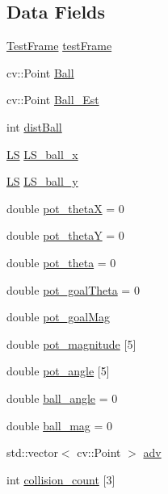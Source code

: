 \subsection*{Data Fields}
\begin{DoxyCompactItemize}
\item 
\hyperlink{class_test_frame}{Test\+Frame} \hyperlink{class_strategy_a6fabfc409deb567f30bae2150cfbafad}{test\+Frame}
\item 
cv\+::\+Point \hyperlink{class_strategy_abd16b6276e747f6cd99a19963ff5495b}{Ball}
\item 
cv\+::\+Point \hyperlink{class_strategy_ae629b11b862d24dba3fb3322659e439e}{Ball\+\_\+\+Est}
\item 
int \hyperlink{class_strategy_aff212e34800434ae7fa87fc55bca4531}{dist\+Ball}
\item 
\hyperlink{class_l_s}{LS} \hyperlink{class_strategy_ab9ecf12e9440d653dd732674b78ce02b}{L\+S\+\_\+ball\+\_\+x}
\item 
\hyperlink{class_l_s}{LS} \hyperlink{class_strategy_aba301b4dd7bac24f2db4ca16c1f96608}{L\+S\+\_\+ball\+\_\+y}
\item 
double \hyperlink{class_strategy_a6963136ba083ba7cf239505b6a587114}{pot\+\_\+thetaX} = 0
\item 
double \hyperlink{class_strategy_a3318f16f937458878a810d28b99bb7a7}{pot\+\_\+thetaY} = 0
\item 
double \hyperlink{class_strategy_a6c8c8a503e17ffce2659af9e33ea86c8}{pot\+\_\+theta} = 0
\item 
double \hyperlink{class_strategy_a457318bd476c9e6debdd872c7d3fe2e7}{pot\+\_\+goal\+Theta} = 0
\item 
double \hyperlink{class_strategy_a270b91b248a4eb66b356a25e9d1f3f60}{pot\+\_\+goal\+Mag}
\item 
double \hyperlink{class_strategy_afbe79a1885f82b70c71eb30d07fde921}{pot\+\_\+magnitude} \mbox{[}5\mbox{]}
\item 
double \hyperlink{class_strategy_a8784fcebd4a51853658f9e196e6cd3ea}{pot\+\_\+angle} \mbox{[}5\mbox{]}
\item 
double \hyperlink{class_strategy_a595a6feb9d4a1e3c36185faba232f0d9}{ball\+\_\+angle} = 0
\item 
double \hyperlink{class_strategy_a8c03a4d7a8c88b32d19fe3cd99029c02}{ball\+\_\+mag} = 0
\item 
std\+::vector$<$ cv\+::\+Point $>$ \hyperlink{class_strategy_a4ebbce7f034aaca32adbd4f9607642d9}{adv}
\item 
int \hyperlink{class_strategy_a5ca4277b2cb59fbd6732c1ffa91e0760}{collision\+\_\+count} \mbox{[}3\mbox{]}

\end{DoxyCompactItemize}
